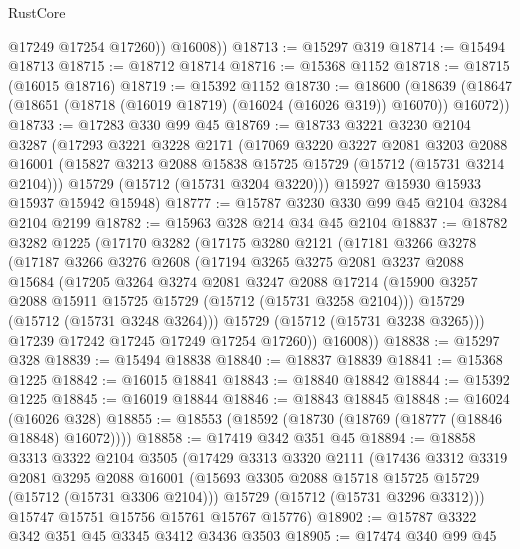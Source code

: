 \begin{lexlean}{RustCore}
\begin{coremodule}
            @17249
            @17254
            @17260))
        @16008))
@18713 := @15297 @319
@18714 := @15494 @18713
@18715 := @18712 @18714
@18716 := @15368 @1152
@18718 := @18715 (@16015 @18716)
@18719 := @15392 @1152
@18730 := @18600
    (@18639 (@18647 (@18651 (@18718 (@16019 @18719) (@16024 (@16026 @319)) @16070)) @16072))
@18733 := @17283 @330 @99 @45
@18769 := @18733
    @3221
    @3230
    @2104
    @3287
    (@17293
      @3221
      @3228
      @2171
      (@17069
        @3220
        @3227
        @2081
        @3203
        @2088
        @16001
        (@15827 @3213 @2088 @15838 @15725 @15729 (@15712 (@15731 @3214 @2104)))
        @15729
        (@15712 (@15731 @3204 @3220)))
      @15927
      @15930
      @15933
      @15937
      @15942
      @15948)
@18777 := @15787 @3230 @330 @99 @45 @2104 @3284 @2104 @2199
@18782 := @15963 @328 @214 @34 @45 @2104
@18837 := @18782
    @3282
    @1225
    (@17170
      @3282
      (@17175
        @3280
        @2121
        (@17181
          @3266
          @3278
          (@17187
            @3266
            @3276
            @2608
            (@17194
              @3265
              @3275
              @2081
              @3237
              @2088
              @15684
              (@17205
                @3264
                @3274
                @2081
                @3247
                @2088
                @17214
                (@15900 @3257 @2088 @15911 @15725 @15729 (@15712 (@15731 @3258 @2104)))
                @15729
                (@15712 (@15731 @3248 @3264)))
              @15729
              (@15712 (@15731 @3238 @3265)))
            @17239
            @17242
            @17245
            @17249
            @17254
            @17260))
        @16008))
@18838 := @15297 @328
@18839 := @15494 @18838
@18840 := @18837 @18839
@18841 := @15368 @1225
@18842 := @16015 @18841
@18843 := @18840 @18842
@18844 := @15392 @1225
@18845 := @16019 @18844
@18846 := @18843 @18845
@18848 := @16024 (@16026 @328)
@18855 := @18553 (@18592 (@18730 (@18769 (@18777 (@18846 @18848) @16072))))
@18858 := @17419 @342 @351 @45
@18894 := @18858
    @3313
    @3322
    @2104
    @3505
    (@17429
      @3313
      @3320
      @2111
      (@17436
        @3312
        @3319
        @2081
        @3295
        @2088
        @16001
        (@15693 @3305 @2088 @15718 @15725 @15729 (@15712 (@15731 @3306 @2104)))
        @15729
        (@15712 (@15731 @3296 @3312)))
      @15747
      @15751
      @15756
      @15761
      @15767
      @15776)
@18902 := @15787 @3322 @342 @351 @45 @3345 @3412 @3436 @3503
@18905 := @17474 @340 @99 @45

\end{coremodule}
\end{lexlean}
